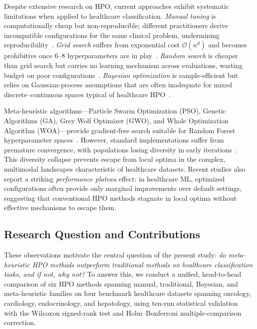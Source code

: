 \documentclass[letterpaper, 10 pt, conference]{ieeeconf}
\begin{document}
Despite extensive research on HPO, current approaches exhibit systematic limitations when applied to healthcare classification. \emph{Manual tuning} is computationally cheap but non-reproducible; different practitioners derive incompatible configurations for the same clinical problem, undermining reproducibility~\cite{bischl2023, raji2022}. \emph{Grid search} suffers from exponential cost $\mathcal{O}(n^d)$ and becomes prohibitive once $6$--$8$ hyperparameters are in play~\cite{elgeldawi2021, bischl2023}. \emph{Random search} is cheaper than grid search but carries no learning mechanism across evaluations, wasting budget on poor configurations~\cite{bergstra2012}. \emph{Bayesian optimization} is sample-efficient but relies on Gaussian-process assumptions that are often inadequate for mixed discrete--continuous spaces typical of healthcare HPO~\cite{abbas2023}.

Meta-heuristic algorithms---Particle Swarm Optimization (PSO), Genetic Algorithms (GA), Grey Wolf Optimizer (GWO), and Whale Optimization Algorithm (WOA)---provide gradient-free search suitable for Random Forest hyperparameter spaces~\cite{huo2022, otero2012, tayebi2022}. However, standard implementations suffer from premature convergence, with populations losing diversity in early iterations~\cite{huo2022, yang2023}. This diversity collapse prevents escape from local optima in the complex, multimodal landscapes characteristic of healthcare datasets. Recent studies also report a striking \emph{performance plateau} effect: in healthcare ML, optimized configurations often provide only marginal improvements over default settings, suggesting that conventional HPO methods stagnate in local optima without effective mechanisms to escape them.

\subsection{Research Question and Contributions}

These observations motivate the central question of the present study: \emph{do meta-heuristic HPO methods outperform traditional methods on healthcare classification tasks, and if not, why not?} To answer this, we conduct a unified, head-to-head comparison of six HPO methods spanning manual, traditional, Bayesian, and meta-heuristic families on four benchmark healthcare datasets spanning oncology, cardiology, endocrinology, and hepatology, using ten-run statistical validation with the Wilcoxon signed-rank test and Holm--Bonferroni multiple-comparison correction.
\end{document}
